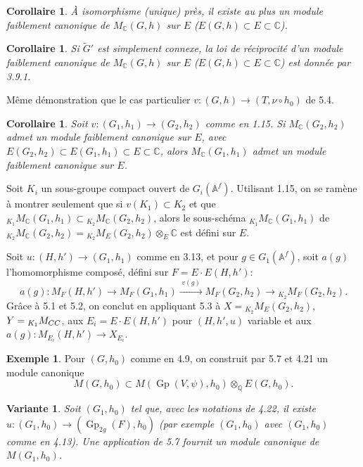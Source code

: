 \documentclass[11pt]{amsart}
\theoremstyle{plain}
\newtheorem{corollary}[theorem]{Corollaire}
\newtheorem{variante}{Variante}
\theoremstyle{definition}
\newtheorem{example}[theorem]{Exemple}
\DeclareMathOperator{\Gp}{Gp}
\newcommand{\QQ}{\mathbb{Q}}
\newcommand{\CC}{\mathbb{C}}
\newcommand{\AAf}{\mathbb{A}^f}
\newcommand{\MC}{M_{\mathbb{C}}}
\begin{document}
\begin{corollary}
\`A isomorphisme (unique) pr\`es, il existe au plus un module faiblement canonique de $\MC(G,h)$ sur $E$ ($E(G,h) \subset E \subset \CC$).
\end{corollary}

\begin{corollary}
Si $\tilde{G}'$ est simplement connexe, la loi de r\'eciprocit\'e d'un module faiblement canonique de $\MC(G,h)$ sur $E$ ($E(G,h) \subset E \subset \CC$) est donn\'ee par 3.9.1.
\end{corollary}

M\^eme d\'emonstration que le cas particulier $v : (G,h) \to (T, \nu \circ h_0)$ de 5.4.

\begin{corollary}
Soit $v : (G_1, h_1) \to (G_2, h_2)$ comme en 1.15. Si $\MC(G_2, h_2)$ admet un module faiblement canonique sur $E$, avec $E(G_2, h_2) \subset E(G_1, h_1) \subset E \subset \CC$, alors $\MC(G_1, h_1)$ admet un module faiblement canonique sur $E$.
\end{corollary}

Soit $K_i$ un sous-groupe compact ouvert de $G_i(\AAf)$. Utilisant 1.15, on se ram\`ene \`a montrer seulement que si $v(K_1) \subset K_2$ et que ${}_{K_1} \MC(G_1, h_1) \subset {}_{K_2} \MC(G_2, h_2)$, alors le sous-sch\'ema ${}_{K_1} \MC(G_1, h_1)$ de ${}_{K_2} \MC(G_2, h_2) = {}_{K_2} M_E(G_2, h_2) \otimes_E \CC$ est d\'efini sur $E$.

Soit $u : (H,h') \to (G_1, h_1)$ comme en 3.13, et pour $g \in G_1(\AAf)$, soit $a(g)$ l'homomorphisme compos\'e, d\'efini sur $F = E \cdot E(H,h')$:
\[
a(g) : M_F(H,h') \longrightarrow M_F(G_1, h_1) \xrightarrow{\;v(g)\;} M_F(G_2, h_2) \longrightarrow {}_{K_2} M_F(G_2, h_2).
\]
Gr\^ace \`a 5.1 et 5.2, on conclut en appliquant 5.3 \`a $X = {}_{K_2} M_E(G_2, h_2)$, $Y = {}_{K_1} M_{\\CC}$, aux $E_i = E \cdot E(H,h')$ pour $(H,h',u)$ variable et aux $a(g) : M_{E_i}(H,h') \to X_{E_i}$.

\begin{example}
Pour $(G, h_0)$ comme en 4.9, on construit par 5.7 et 4.21 un module canonique
\[
M(G, h_0) \subset M(\Gp(V, \psi), h_0) \otimes_{\QQ} E(G, h_0).
\]
\end{example}

\begin{variante}
Soit $(G_1, h_0)$ tel que, avec les notations de 4.22, il existe $u : (G_1, h_0) \to (\Gp_{2g}(F), h_0)$ (par exemple $(G_1, h_0)$ avec $(G_1, h_0)$ comme en 4.13). Une application de 5.7 fournit un module canonique de $M(G_1, h_0)$.
\end{variante}
\end{document}
